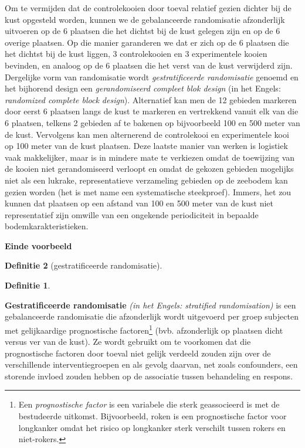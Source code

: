 \documentclass[
  12pt,dutch,coursenotes]{book}
\theoremstyle{definition}
\newtheorem{definition}{Definitie}[chapter]
\theoremstyle{definition}
\theoremstyle{definition}
\theoremstyle{remark}
\begin{document}
Om te vermijden dat de controlekooien door toeval relatief gezien dichter bij de kust opgesteld worden, kunnen we de gebalanceerde randomisatie afzonderlijk uitvoeren op de 6 plaatsen die het dichtst bij de kust gelegen zijn en op de 6 overige plaatsen. Op die manier garanderen we dat er zich op de 6 plaatsen die het dichtst bij de kust liggen, 3 controlekooien en 3 experimentele kooien bevinden, en analoog op de 6 plaatsen die het verst van de kust verwijderd zijn. Dergelijke vorm van randomisatie wordt \emph{gestratificeerde randomisatie}
genoemd en het bijhorend design een \emph{gerandomiseerd compleet blok design} (in het Engels: \emph{randomized complete block design}). Alternatief kan men de 12 gebieden markeren door eerst 6 plaatsen langs de kust te markeren en vertrekkend vanuit elk van die 6 plaatsen, telkens 2 gebieden af te bakenen op bijvoorbeeld 100 en 500 meter van de kust. Vervolgens kan men alternerend de controlekooi en experimentele kooi op 100 meter van de kust plaatsen. Deze laatste manier van werken is logistiek vaak makkelijker, maar is in mindere mate te verkiezen omdat de toewijzing van de kooien niet gerandomiseerd verloopt en omdat de gekozen gebieden mogelijks niet als een lukrake, representatieve verzameling gebieden op de zeebodem kan gezien worden (het is met name een systematische steekproef). Immers, het zou kunnen dat plaatsen op een afstand van 100 en 500 meter van de kust niet representatief zijn omwille van een ongekende periodiciteit in bepaalde bodemkarakteristieken.

\textbf{Einde voorbeeld}

\begin{definition}[gestratificeerde randomisatie]
\begin{definition}

\protect\hypertarget{def:unnamed-chunk-72}{}{\label{def:unnamed-chunk-72} \iffalse (gestratificeerde randomisatie) \fi{} }

\end{definition}
\end{definition}

\textbf{Gestratificeerde randomisatie} \emph{(in het Engels: stratified
randomisation)} is een gebalanceerde randomisatie die afzonderlijk wordt
uitgevoerd per groep subjecten met gelijkaardige prognostische factoren\footnote{Een \emph{prognostische factor} is een variabele die sterk geassocieerd is met de
  bestudeerde uitkomst. Bijvoorbeeld, roken is een prognostische factor voor
  longkanker omdat het risico op longkanker sterk verschilt tussen rokers en
  niet-rokers.}
(bvb. afzonderlijk op plaatsen dicht versus ver van de kust). Ze wordt gebruikt
om te voorkomen dat die prognostische factoren door toeval niet gelijk
verdeeld zouden zijn over de verschillende interventiegroepen en als gevolg
daarvan, net zoals confounders, een storende invloed zouden hebben op de
associatie tussen behandeling en respons.
\end{document}
